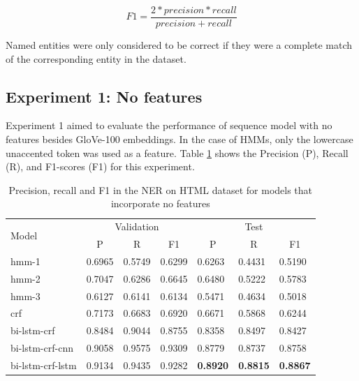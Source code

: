 \documentclass{nle}
\begin{document}
\begin{equation}
F1 = \frac{2 * precision * recall}{precision + recall}
\end{equation}

Named entities were only considered to be correct if they were a complete match of the 
corresponding entity in the dataset.

\subsection{Experiment 1: No features}

Experiment 1 aimed to evaluate the performance of sequence model with no features
besides GloVe-100 embeddings. In the case of HMMs, only the lowercase
unaccented token was used as a feature. Table \ref{tab:experiment1} 
shows the Precision (P), Recall (R), and F1-scores (F1) for this
experiment.

\begin{table}[h]
  \small
  \begin{center}
    \begin{tabular}{ lllllll }
      \toprule
      \multirow{2}{*}{Model} & \multicolumn{3}{c}{Validation} & \multicolumn{3}{c}{Test} \\
                             & \multicolumn{1}{c}{P} & \multicolumn{1}{c}{R} & \multicolumn{1}{c}{F1}
                             & \multicolumn{1}{c}{P} & \multicolumn{1}{c}{R} & \multicolumn{1}{c}{F1} \\
      \midrule
      hmm-1	       & 0.6965 & 0.5749 & 0.6299 & 0.6263 & 0.4431 & 0.5190 \\
      hmm-2	       & 0.7047 & 0.6286 & 0.6645 & 0.6480 & 0.5222 & 0.5783 \\
      hmm-3	       & 0.6127 & 0.6141 & 0.6134 & 0.5471 & 0.4634 & 0.5018 \\
      crf	       & 0.7173 & 0.6683 & 0.6920 & 0.6671 & 0.5868 & 0.6244 \\
      bi-lstm-crf      & 0.8484 & 0.9044 & 0.8755 & 0.8358 & 0.8497 & 0.8427 \\
      bi-lstm-crf-cnn  & 0.9058 & 0.9575 & 0.9309 & 0.8779 & 0.8737 & 0.8758 \\
      bi-lstm-crf-lstm & 0.9134 & 0.9435 & 0.9282 & \textbf{0.8920} & \textbf{0.8815} & \textbf{0.8867} \\
      \bottomrule
    \end{tabular}
  \end{center}
  \caption{Precision, recall and F1 in the NER on HTML dataset for models that incorporate no features}
  \label{tab:experiment1}
\end{table}
\end{document}
